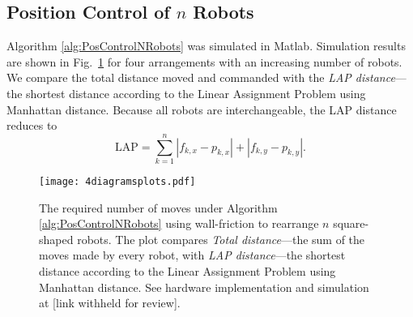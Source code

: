 

\subsection{Position Control of $n$ Robots}
Algorithm \ref{alg:PosControlNRobots}  was simulated in {\sc Matlab}.
Simulation results are shown in Fig.~\ref{fig:4diagramsplots.pdf} for four arrangements with an increasing number of robots.  We compare the total distance moved and commanded  with the  \emph{LAP distance}---the shortest distance according to the Linear Assignment Problem using Manhattan distance.   Because all robots are interchangeable, the LAP distance reduces to
 \[ \text{LAP} =   \sum_{k=1}^n  \left| f_{k,x}-p_{k,x} \right| +  \left|  f_{k,y}-p_{k,y}  \right| . \]


\begin{figure}
\begin{center}
	\texttt{[image: 4diagramsplots.pdf]}
\end{center}
\caption{\label{fig:4diagramsplots.pdf}
The required number of moves under Algorithm \ref{alg:PosControlNRobots}  using wall-friction to rearrange $n$ square-shaped 
robots.  The plot compares  \emph{Total distance}---the sum of the moves made by every robot, with \emph{LAP distance}---the shortest distance according to the Linear Assignment Problem using Manhattan distance.  See hardware implementation and simulation at [link withheld for review].
}
\end{figure}

